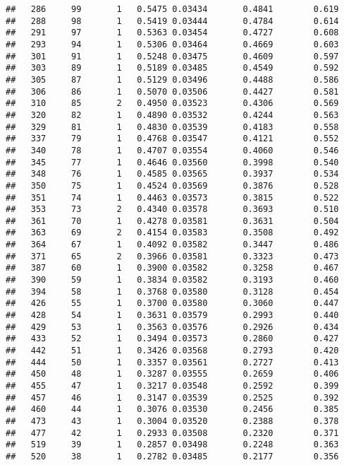 \documentclass[]{article}
\begin{document}
\begin{verbatim}
##   286     99       1   0.5475 0.03434       0.4841        0.619
##   288     98       1   0.5419 0.03444       0.4784        0.614
##   291     97       1   0.5363 0.03454       0.4727        0.608
##   293     94       1   0.5306 0.03464       0.4669        0.603
##   301     91       1   0.5248 0.03475       0.4609        0.597
##   303     89       1   0.5189 0.03485       0.4549        0.592
##   305     87       1   0.5129 0.03496       0.4488        0.586
##   306     86       1   0.5070 0.03506       0.4427        0.581
##   310     85       2   0.4950 0.03523       0.4306        0.569
##   320     82       1   0.4890 0.03532       0.4244        0.563
##   329     81       1   0.4830 0.03539       0.4183        0.558
##   337     79       1   0.4768 0.03547       0.4121        0.552
##   340     78       1   0.4707 0.03554       0.4060        0.546
##   345     77       1   0.4646 0.03560       0.3998        0.540
##   348     76       1   0.4585 0.03565       0.3937        0.534
##   350     75       1   0.4524 0.03569       0.3876        0.528
##   351     74       1   0.4463 0.03573       0.3815        0.522
##   353     73       2   0.4340 0.03578       0.3693        0.510
##   361     70       1   0.4278 0.03581       0.3631        0.504
##   363     69       2   0.4154 0.03583       0.3508        0.492
##   364     67       1   0.4092 0.03582       0.3447        0.486
##   371     65       2   0.3966 0.03581       0.3323        0.473
##   387     60       1   0.3900 0.03582       0.3258        0.467
##   390     59       1   0.3834 0.03582       0.3193        0.460
##   394     58       1   0.3768 0.03580       0.3128        0.454
##   426     55       1   0.3700 0.03580       0.3060        0.447
##   428     54       1   0.3631 0.03579       0.2993        0.440
##   429     53       1   0.3563 0.03576       0.2926        0.434
##   433     52       1   0.3494 0.03573       0.2860        0.427
##   442     51       1   0.3426 0.03568       0.2793        0.420
##   444     50       1   0.3357 0.03561       0.2727        0.413
##   450     48       1   0.3287 0.03555       0.2659        0.406
##   455     47       1   0.3217 0.03548       0.2592        0.399
##   457     46       1   0.3147 0.03539       0.2525        0.392
##   460     44       1   0.3076 0.03530       0.2456        0.385
##   473     43       1   0.3004 0.03520       0.2388        0.378
##   477     42       1   0.2933 0.03508       0.2320        0.371
##   519     39       1   0.2857 0.03498       0.2248        0.363
##   520     38       1   0.2782 0.03485       0.2177        0.356

\end{verbatim}
\end{document}
